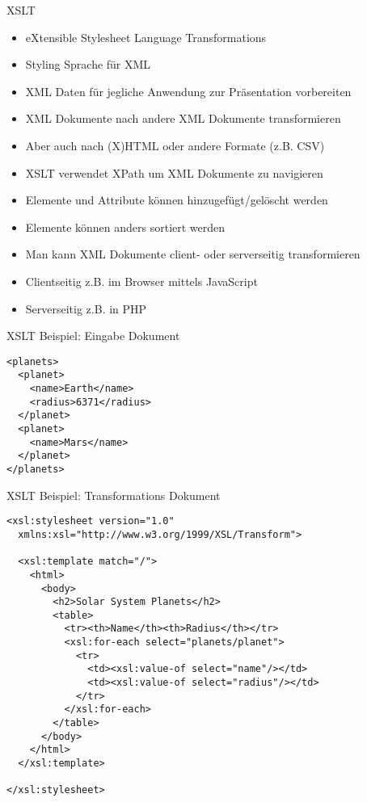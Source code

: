 \documentclass{beamer}
\begin{document}
\begin{frame}{XSLT}
	
	\begin{itemize}
		\item eXtensible Stylesheet Language Transformations
		\item Styling Sprache für XML
		\item XML Daten für jegliche Anwendung zur Präsentation vorbereiten
		\item XML Dokumente nach andere XML Dokumente transformieren
		\item Aber auch nach (X)HTML oder andere Formate (z.B. CSV)
		\item XSLT verwendet XPath um XML Dokumente zu navigieren
		\item Elemente und Attribute können hinzugefügt/gelöscht werden
		\item Elemente können anders sortiert werden
		\item Man kann XML Dokumente client- oder serverseitig transformieren
		\item Clientseitig z.B. im Browser mittels JavaScript
		\item Serverseitig z.B. in PHP
	\end{itemize}
	
\end{frame}

\begin{frame}[fragile]{XSLT Beispiel: Eingabe Dokument}
	
	\lstset{language=XML}
	\begin{lstlisting}
<planets>
  <planet>
    <name>Earth</name>
    <radius>6371</radius>
  </planet>
  <planet>
    <name>Mars</name>
  </planet>
</planets>
	\end{lstlisting}
	
\end{frame}


\begin{frame}[fragile]{XSLT Beispiel: Transformations Dokument}
	
	\lstset{language=XML}\scriptsize
	\begin{lstlisting}
<xsl:stylesheet version="1.0"
  xmlns:xsl="http://www.w3.org/1999/XSL/Transform">

  <xsl:template match="/">
    <html>
      <body>
        <h2>Solar System Planets</h2>
        <table>
          <tr><th>Name</th><th>Radius</th></tr>
          <xsl:for-each select="planets/planet">
            <tr>
              <td><xsl:value-of select="name"/></td>
              <td><xsl:value-of select="radius"/></td>
            </tr>
          </xsl:for-each>
        </table>
      </body>
    </html>
  </xsl:template>

</xsl:stylesheet>
	\end{lstlisting}
	
\end{frame}
\end{document}
